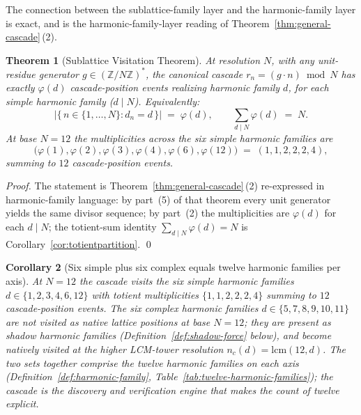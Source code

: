 \documentclass[11pt,a4paper]{article}
\newtheorem{theorem}{Theorem}[section]
\newtheorem{corollary}[theorem]{Corollary}
\theoremstyle{definition}
\theoremstyle{remark}
\newcommand{\Z}{\mathbb{Z}}
\begin{document}
The connection between the sublattice-family layer and the harmonic-family layer is exact, and is the harmonic-family-layer reading of Theorem~\ref{thm:general-cascade}\,(2).

\begin{theorem}[Sublattice Visitation Theorem]\label{thm:visitation}
At resolution $N$, with any unit-residue generator $g \in (\Z/N\Z)^{*}$, the canonical cascade $r_{n} = (g\cdot n) \bmod N$ has exactly $\varphi(d)$ cascade-position events realizing harmonic family $d$, for each simple harmonic family ($d \mid N$). Equivalently:
\[
\bigl|\{\, n \in \{1,\ldots,N\} : d_{n} = d \,\}\bigr| \;=\; \varphi(d), \qquad \sum_{d\mid N} \varphi(d) \;=\; N.
\]
At base $N=12$ the multiplicities across the six simple harmonic families are
\[
\bigl(\varphi(1),\varphi(2),\varphi(3),\varphi(4),\varphi(6),\varphi(12)\bigr) \;=\; (1,1,2,2,2,4),
\]
summing to $12$ cascade-position events.
\end{theorem}

\begin{proof}
The statement is Theorem~\ref{thm:general-cascade}\,(2) re-expressed in harmonic-family language: by part~(5) of that theorem every unit generator yields the same divisor sequence; by part~(2) the multiplicities are $\varphi(d)$ for each $d \mid N$; the totient-sum identity $\sum_{d \mid N}\varphi(d) = N$ is Corollary~\ref{cor:totientpartition}. \qed
\end{proof}

\begin{corollary}[Six simple plus six complex equals twelve harmonic families per axis]\label{cor:six-plus-six}
At $N=12$ the cascade visits the six simple harmonic families $d \in \{1,2,3,4,6,12\}$ with totient multiplicities $\{1,1,2,2,2,4\}$ summing to $12$ cascade-position events. The six complex harmonic families $d \in \{5,7,8,9,10,11\}$ are not visited as native lattice positions at base $N=12$; they are present as shadow harmonic families (Definition~\ref{def:shadow-force} below), and become natively visited at the higher LCM-tower resolution $n_{c}(d) = \mathrm{lcm}(12,d)$. The two sets together comprise the twelve harmonic families on each axis (Definition~\ref{def:harmonic-family}, Table~\ref{tab:twelve-harmonic-families}); the cascade is the discovery and verification engine that makes the count of twelve explicit.
\end{corollary}
\end{document}
